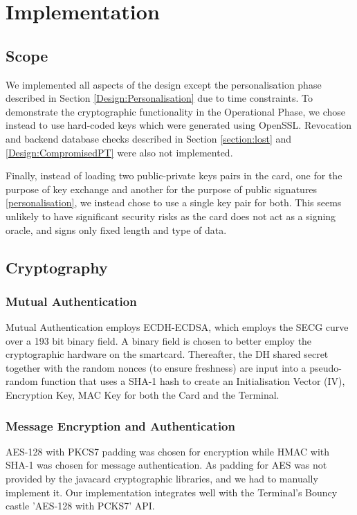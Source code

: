 \documentclass[a4paper,10pt]{llncs}
\begin{document}
\section{Implementation}

\subsection{Scope}
We implemented all aspects of the design except the personalisation phase described in Section \ref{Design:Personalisation} due to time constraints. To demonstrate the cryptographic functionality in the Operational Phase, we chose instead to use hard-coded keys which were generated using OpenSSL. Revocation and backend database checks described in Section \ref{section:lost} and \ref{Design:CompromisedPT} were also not implemented. 

Finally, instead of loading two public-private keys pairs in the card, one for the purpose of key exchange and another for the purpose of public signatures \ref{personalisation}, we instead chose to use a single key pair for both. This seems unlikely to have significant security risks as the card does not act as a signing oracle, and signs only fixed length and type of data.

\subsection{Cryptography}
\subsubsection{Mutual Authentication}
Mutual Authentication employs ECDH-ECDSA, which employs the SECG curve over a 193 bit binary field. A binary field is chosen to better employ the cryptographic hardware on the smartcard. Thereafter, the DH shared secret together with the random nonces (to ensure freshness) are input into a pseudo-random function that uses a SHA-1 hash to create an Initialisation Vector (IV), Encryption Key, MAC Key for both the Card and the Terminal. 

\subsubsection{Message Encryption and Authentication}
AES-128 with PKCS7 padding was chosen for encryption while HMAC with SHA-1 was chosen for message authentication. As padding for AES was not provided by the javacard cryptographic libraries, and we had to manually implement it. Our implementation integrates well with the Terminal's Bouncy castle 'AES-128 with PCKS7' API.
\end{document}
